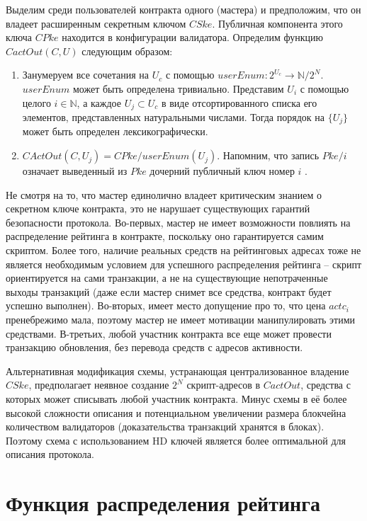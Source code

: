 \documentclass[specification,annotation]{itmo-student-thesis}
\begin{document}
Выделим среди пользователей контракта одного (мастера) и предположим,
что он владеет расширенным секретным ключом $CSke$. Публичная
компонента этого ключа $CPke$ находится в конфигурации
валидатора. Определим функцию $CactOut(C,U)$ следующим образом:

\begin{enumerate}
\item Занумеруем все сочетания на $U_c$ с помощью $userEnum : 2^{U_c}
  \rightarrow \mathbb{N} / 2^N$. $userEnum$ может быть определена
  тривиально. Представим $U_i$ с помощью целого $i \in \mathbb{N}$, а
  каждое $U_j \subset U_c$ в виде отсортированного списка его
  элементов, представленных натуральными числами. Тогда порядок на
  $\{U_j\}$ может быть определен лексикографически.
\item $CActOut(C,U_j) = CPke/userEnum(U_j)$. Напомним, что запись
  $Pke/i$ означает выведенный из $Pke$ дочерний публичный ключ номер
  $i$ .
\end{enumerate}

Не смотря на то, что мастер единолично владеет критическим знанием о
секретном ключе контракта, это не нарушает существующих гарантий
безопасности протокола. Во-первых, мастер не имеет возможности
повлиять на распределение рейтинга в контракте, поскольку оно
гарантируется самим скриптом. Более того, наличие реальных средств на
рейтинговых адресах тоже не является необходимым условием для
успешного распределения рейтинга -- скрипт ориентируется на сами
транзакции, а не на существующие непотраченные выходы транзакций (даже
если мастер снимет все средства, контракт будет успешно
выполнен). Во-вторых, имеет место допущение про то, что цена $actc_i$
пренебрежимо мала, поэтому мастер не имеет мотивации манипулировать
этими средствами. В-третьих, любой участник контракта все еще может
провести транзакцию обновления, без перевода средств с адресов
активности.

Альтернативная модификация схемы, устранающая централизованное
владение $CSke$, предполагает неявное создание $2^N$ скрипт-адресов в
$CactOut$, средства с которых может списывать любой участник
контракта. Минус схемы в её более высокой сложности описания и
потенциальном увеличении размера блокчейна количеством валидаторов
(доказательства транзакций хранятся в блоках). Поэтому схема с
использованием HD ключей является более оптимальной для описания
протокола.

\section{Функция распределения рейтинга}
\end{document}
